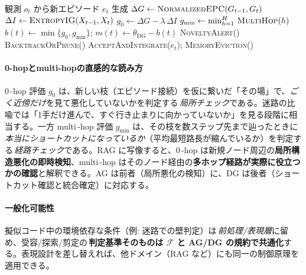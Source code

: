 \documentclass[ja=standard,xelatex]{bxjsarticle}
\newcommand{\F}{\mathcal{F}}
\begin{document}
\begin{algorithm}[H]
\caption{One\,\mbox{-}Gauge イベント駆動制御}\label{alg:one_gauge}
\begin{algorithmic}[1]
\State 観測 $o_t$ から新エピソード $e_t$ 生成
\State $\Delta G \gets \textsc{NormalizedEPC}(G_{t-1}, G_t)$ 
\State $\Delta I \gets \textsc{EntropyIG}(X_{t-1}, X_t)$
\State $g_0 \gets \Delta G - \lambda\,\Delta I$
\State $g_{\min} \gets \min_{h=1}^{H}\, \textsc{MultiHop}(h)$
\State $b(t) \gets \min\{g_0, g_{\min}\}$;\; $m(t) \gets \theta_{\mathrm{DG}}-b(t)$
  \State \textsc{NoveltyAlert}() 
\EndIf
{}
  \State \textsc{BacktrackOrPrune}() 
  \State {}
  \State \textsc{AcceptAndIntegrate}($e_t$);\; \textsc{MemoryEviction}() 
\EndIf
\end{algorithmic}
\end{algorithm}

\paragraph{0-hopとmulti-hopの直感的な読み方}
0\,\mbox{-}hop 評価 $g_0$ は、新しい枝（エピソード接続）を仮に繋いだ「その場」で、\emph{ごく近傍だけ}を見て悪化していないかを判定する\,\emph{局所チェック}である。迷路の比喩では「1手だけ進んで、すぐ行き止まりに向かっていないか」を見る段階に相当する。一方 multi\,\mbox{-}hop 評価 $g_{\min}$ は、その枝を数ステップ先まで辿ったときに\,\emph{本当にショートカットになっているか}（平均最短路長が縮んでいるか）を判定する\,\emph{経路チェック}である。RAG に写像すると、0\,\mbox{-}hop は新規ノード周辺の\textbf{局所構造悪化の即時検知}、multi\,\mbox{-}hop はそのノード経由の\textbf{多ホップ経路が実際に役立つかの確認}と解釈できる。AG は前者（局所悪化の検知）に、DG は後者（ショートカット確認と統合確定）に対応する。

\paragraph{一般化可能性}\; 擬似コード中の環境依存な条件（例: 迷路での壁判定）は\,\emph{前処理/表現層}に留め、受容/探索/剪定の\,\textbf{判定基準そのものは $\F$ と AG/DG の規約で共通化}する。表現設計を差し替えれば、他ドメイン（RAG など）にも同一の制御原理を適用できる。
\end{document}
